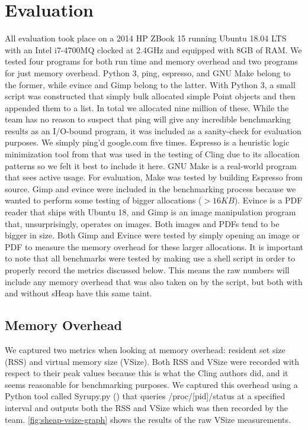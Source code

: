 \documentclass[conference]{IEEEtran}
\begin{document}
\section{Evaluation}
All evaluation took place on a 2014 HP ZBook 15 running Ubuntu 18.04 LTS with an Intel 
i7-4700MQ clocked at 2.4GHz and equipped with 8GB of RAM. We tested four programs for 
both run time and memory overhead and two programs for just memory overhead. Python 3, 
ping, espresso, and GNU Make belong to the former, while evince and Gimp belong to the 
latter. With Python 3, a small script was constructed that simply bulk allocated simple 
Point objects and then appended them to a list. In total we allocated nine million of 
these. While the team has no reason to suspect that ping will give any incredible 
benchmarking results as an I/O-bound program, it was included as a sanity-check for 
evaluation purposes. We simply ping’d google.com five times. Espresso is a heuristic 
logic minimization tool from \cite{b4} that was used in the testing of Cling due to 
its allocation patterns so we felt it best to include it here. GNU Make is a 
real-world program that sees active usage. For evaluation, Make was tested by building 
Espresso from source. Gimp and evince were included in the benchmarking process because 
we wanted to perform some testing of bigger allocations ($>16KB$). Evince is a PDF reader 
that ships with Ubuntu 18, and Gimp is an image manipulation program that, 
unsurprisingly, operates on images. Both images and PDFs tend to be bigger in 
size. Both Gimp and Evince were tested by simply opening an image or PDF to measure the 
memory overhead for these larger allocations. It is important to note that all 
benchmarks were tested by making use a shell script in order to properly record the 
metrics discussed below. This means the raw numbers will include any memory overhead that 
was also taken on by the script, but both with and without sHeap have this same taint.

\subsection{Memory Overhead}
We captured two metrics when looking at memory overhead: resident set size (RSS) and 
virtual memory size (VSize). Both RSS and VSize were recorded with respect to their peak 
values because this is what the Cling authors did, and it seems reasonable for 
benchmarking purposes. We captured this overhead using a Python tool called Syrupy.py 
(\cite{b5}) that queries /proc/[pid]/status at a specified interval and outputs both the 
RSS and VSize which was then recorded by the team. \ref{fig:sheap-vsize-graph} shows the 
results of the raw VSize measurements. 
\end{document}
